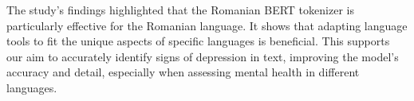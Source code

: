 The study's \cite{dumitrescu2020birth} findings highlighted that the Romanian BERT tokenizer is particularly effective for the Romanian language. It shows that adapting language tools to fit the unique aspects of specific languages is beneficial. This supports our aim to accurately identify signs of depression in text, improving the model's accuracy and detail, especially when assessing mental health in different languages.
